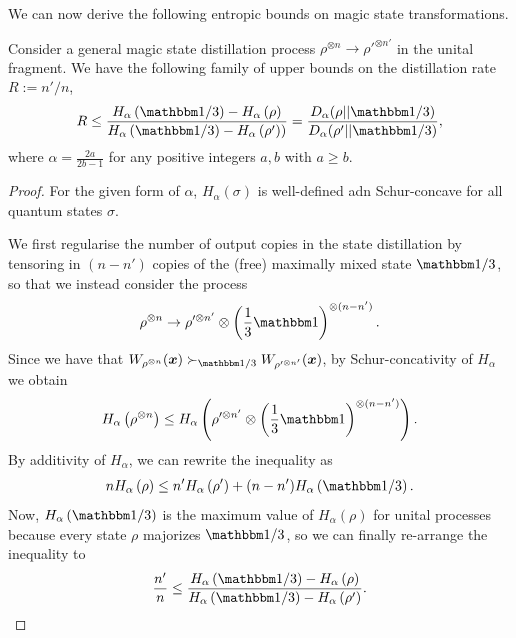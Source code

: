 \documentclass[pra,
aps,
twocolumn,
superscriptaddress,
groupedaddress,
nofootinbib,
reprint
]{revtex4-1}
\begin{document}
We can now derive the following entropic bounds on magic state transformations.
\begin{theorem}
	Consider a general magic state distillation process $\rho^{\otimes n} \rightarrow \rho'^{\otimes n'}$	in the unital fragment.
	We have the following family of upper bounds on the distillation rate $R := n'/n$,
	\begin{equation}
		R \leq \frac{H_\alpha \left( \id/3 \right) - H_\alpha \left( \rho \right)}{H_\alpha \left( \id/3 \right) - H_\alpha \left( \rho') \right)} = \frac{D_{\alpha}(\rho||\id/3)}{D_{\alpha}(\rho'||\id/3)},
	\end{equation}
	where $\alpha = \frac{2a}{2b-1}$ for any positive integers $a,b$ with $a \geq b$.
\end{theorem}
\begin{proof}
	For the given form of $\alpha$, $H_\alpha(\sigma)$ is well-defined adn Schur-concave for all quantum states $\sigma$.
	
	We first regularise the number of output copies in the state distillation by tensoring in $(n-n')$ copies of the (free) maximally mixed state $\id/3$, so that we instead consider the process
\begin{equation}
	\rho^{\otimes n} \rightarrow \rho'^{\otimes n'} \otimes \left( \frac{1}{3}\id \right)^{\otimes (n - n')}.
\end{equation}
Since we have that $W_{\rho^{\otimes n}}(\bmx) \succ_{\id/3} W_{\rho'^{\otimes n'}}(\bmx)$, by Schur-concativity of $H_\alpha$ we obtain
\begin{equation}
	H_\alpha \left( \rho^{\otimes n} \right) \leq H_\alpha \left( \rho'^{\otimes n'} \otimes \left( \frac{1}{3}\id \right)^{\otimes (n - n')} \right).
\end{equation}
By additivity of $H_\alpha$, we can rewrite the inequality as
\begin{equation}
	n H_\alpha \left( \rho \right) \leq n' H_\alpha \left( \rho' \right) + (n - n') H_\alpha \left( \id/3 \right).
\end{equation}
Now, $H_\alpha \left( \id/3 \right)$ is the maximum value of $H_\alpha(\rho)$ for unital processes because every state $\rho$ majorizes $\id/3$, so we can finally re-arrange the inequality to
\begin{equation}
	\frac{n'}{n} \leq \frac{H_\alpha \left( \id/3 \right) - H_\alpha \left( \rho \right)}{H_\alpha \left( \id/3 \right) - H_\alpha \left( \rho' \right)}.
\end{equation}
\end{proof}
\end{document}
